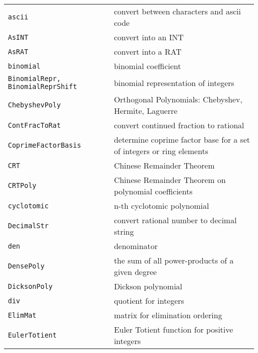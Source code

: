 \documentclass[a4paper]{mybook}
\begin{document}
\begin{center}
\begin{longtable}{ll}
{\verb~ascii~} &
      convert between characters and ascii code\\
   
{\verb~AsINT~} &
      convert into an INT\\
   
{\verb~AsRAT~} &
      convert into a RAT\\
   
{\verb~binomial~} &
      binomial coefficient\\
   
{\verb~BinomialRepr, BinomialReprShift~} &
      binomial representation of integers\\
   
{\verb~ChebyshevPoly~} &
      Orthogonal Polynomials: Chebyshev, Hermite, Laguerre\\
   
{\verb~ContFracToRat~} &
      convert continued fraction to rational\\
   
{\verb~CoprimeFactorBasis~} &
      determine coprime factor base for a set of integers or ring elements\\
   
{\verb~CRT~} &
      Chinese Remainder Theorem\\
   
{\verb~CRTPoly~} &
      Chinese Remainder Theorem on polynomial coefficients\\
   
{\verb~cyclotomic~} &
      n-th cyclotomic polynomial\\
   
{\verb~DecimalStr~} &
      convert rational number to decimal string\\
   
{\verb~den~} &
      denominator\\
   
{\verb~DensePoly~} &
      the sum of all power-products of a given degree\\
   
{\verb~DicksonPoly~} &
      Dickson polynomial\\
   
{\verb~div~} &
      quotient for integers\\
   
{\verb~ElimMat~} &
      matrix for elimination ordering\\
   
{\verb~EulerTotient~} &
      Euler Totient function for positive integers\\
   

\end{longtable}
\end{center}
\end{document}
